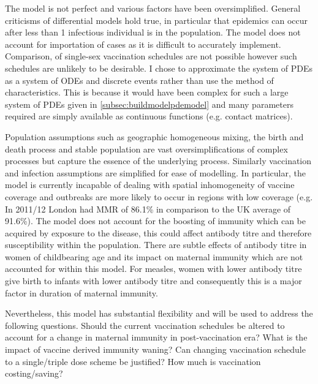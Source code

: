 \documentclass[a4paper,11pt] {scrartcl}
\begin{document}
The model is not perfect and various factors have been oversimplified. General criticisms of differential models hold true, in particular that epidemics can occur after less than 1 infectious individual is in the population. The model does not account for importation of cases as it is difficult to accurately implement. Comparison, of single-sex vaccination schedules are not possible however such schedules are unlikely to be desirable. I chose to approximate the system of PDEs as a system of ODEs and discrete events rather than use the method of characteristics. This is because it would have been complex for such a large system of PDEs given in \autoref{subsec:buildmodelpdemodel} and many parameters required are simply available as continuous functions (e.g. contact matrices).

Population assumptions such as geographic homogeneous mixing, the birth and death process and stable population are vast oversimplifications of complex processes but capture the essence of the underlying process. Similarly vaccination and infection assumptions are simplified for ease of modelling. In particular, the model is currently incapable of dealing with spatial inhomogeneity of vaccine coverage and outbreaks are more likely to occur in regions with low coverage (e.g. In 2011/12 London had MMR of 86.1\% in comparison to the UK average of 91.6\%\cite{vaccinationcoverage2012}). The model does not account for the boosting of immunity which can be acquired by exposure to the disease\cite{glass2003antibody}, this could affect antibody titre and therefore susceptibility within the population. There are subtle effects of antibody titre in women of childbearing age and its impact on maternal immunity which are not accounted for within this model. For measles, women with lower antibody titre give birth to infants with lower antibody titre\cite{goncalves1999transplacental} and consequently this is a major factor in duration of maternal immunity\cite{leuridan2010early}. 

Nevertheless, this model has substantial flexibility and will be used to address the following questions. Should the current vaccination schedules be altered to account for a change in maternal immunity in post-vaccination era? What is the impact of vaccine derived immunity waning? Can changing vaccination schedule to a single/triple dose scheme be justified? How much is vaccination costing/saving?

\newpage
\end{document}
